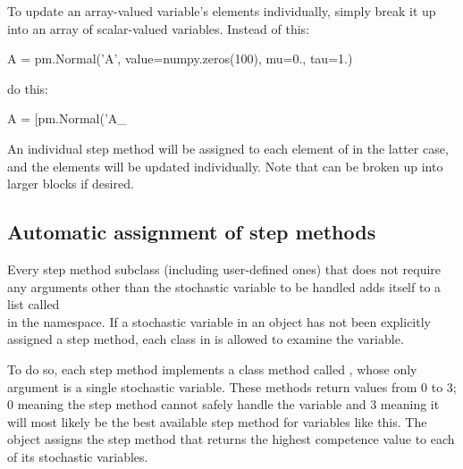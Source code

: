 \documentclass[]{jss}
\begin{document}
To update an array-valued variable's elements individually, simply break it up into an array of scalar-valued variables. Instead of this:
\begin{CodeInput}
A = pm.Normal('A', value=numpy.zeros(100), mu=0., tau=1.)
\end{CodeInput}
do this:
\begin{CodeInput}
A = [pm.Normal('A_%
\end{CodeInput}
An individual step method will be assigned to each element of  in the latter case, and the elements will be updated individually. Note that  can be broken up into larger blocks if desired.

\subsection{Automatic assignment of step methods}
Every step method subclass (including user-defined ones) that does not require any  arguments other than the stochastic variable to be handled adds itself to a list called \\ in the  namespace. If a stochastic variable in an  object has not been explicitly assigned a step method, each class in  is allowed to examine the variable.

To do so, each step method implements a class method called , whose only argument is a single stochastic variable. These methods return values from 0 to 3; 0 meaning the step method cannot safely handle the variable and 3 meaning it will most likely be the best available step method for variables like this. The  object assigns the step method that returns the highest competence value to each of its stochastic variables.
\end{document}
